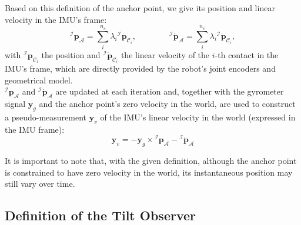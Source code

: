 \documentclass{IJCAS}
\begin{document}
Based on this definition of the anchor point, we give its position and linear velocity in the IMU's frame:
\begin{equation} 
{^{\mathcal{I}}}\boldsymbol{p}_{\mathcal{A}} = \sum^{n_{c}}_{i} \lambda_{i}  {^{\mathcal{I}}} \boldsymbol{p}_{{\mathcal{C}}_{i}} , \qquad \qquad {^{\mathcal{I}}} \dot{\boldsymbol{p}}_{\mathcal{A}} = \sum^{n_{c}}_{i} \lambda_{i}  {^{\mathcal{I}}} \dot{\boldsymbol{p}}_{{\mathcal{C}}_{i}}, \label{eq:imuAnchorKine} 
\end{equation} 
with ${^{\mathcal{I}}} \boldsymbol{p}_{{\mathcal{C}}_{i}}$ the position and ${^{\mathcal{I}}} \dot{\boldsymbol{p}}_{{\mathcal{C}}_{i}}$ the linear velocity of the $i$-th contact in the IMU's frame, which are directly provided by the robot's joint encoders and geometrical model. \\${^{\mathcal{I}}}\boldsymbol{p}_{\mathcal{A}}$ and ${^{\mathcal{I}}} \dot{\boldsymbol{p}}_{\mathcal{A}}$ are updated at each iteration and, together with the gyrometer signal $\boldsymbol{y}_g$ and the anchor point's zero velocity in the world, are used to construct a pseudo-measurement $\boldsymbol{y}_v$ of the IMU's linear velocity in the world (expressed in the IMU frame):
\begin{equation}
    \boldsymbol{y}_v = - \boldsymbol{y}_{g} \times {^{\mathcal{I}}}\boldsymbol{p}_{\mathcal{A}} - {^{\mathcal{I}}} \dot{\boldsymbol{p}}_{\mathcal{A}} \label{eq:yv}
\end{equation}

It is important to note that, with the given definition, although the anchor point is constrained to have zero velocity in the world, its instantaneous position may still vary over time.

\subsection{Definition of the Tilt Observer}
\end{document}
